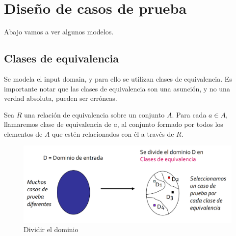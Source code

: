 \chapter{Diseño de casos de prueba}
\begin{figure}[htbp]
   \centering
\end{figure}


Abajo vamos a ver algunos modelos.

\section{Clases de equivalencia}

Se modela el input domain, y para ello se utilizan clases de equivalencia.
Es importante notar que las clases de equivalencia son una asunción, y no una verdad absoluta,  pueden ser erróneas.
\begin{paracol}{2}
   
   \colfill
   Sea $R$ una relación de equivalencia sobre un
   conjunto $A$. Para cada $a \in A$, llamaremos
   clase de equivalencia de $a$, al conjunto
   formado por todos los elementos de $A$ que
   estén relacionados con él a través de $R$.
   \colfill
   
   \switchcolumn

   \begin{figure}[htbp]
      \centering
      \includegraphics{images/05/claseequivalencia.png}
      \caption{Dividir el dominio}
      \label{fig:05/claseequivalencia}
   \end{figure}
\end{paracol}

